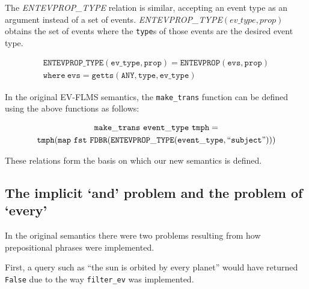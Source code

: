 \documentclass[../main.tex]{subfiles}
\begin{document}
The {\em ENTEVPROP\_TYPE} relation is similar, accepting an event type as an argument instead of a set of events.
{\em ENTEVPROP\_TYPE}$(ev\_type, prop)$ obtains the set of events where the \texttt{type}s of those events are the desired event type.


\begin{definition}
	\begin{multline*}
	\mathtt{ENTEVPROP\_TYPE}(\mathtt{ev\_type}, \mathtt{prop}) = \mathtt{ENTEVPROP}(\mathtt{evs}, \mathtt{prop}) \\ \mathtt{where} \ \mathtt{evs} = \mathtt{getts}(\mathtt{ANY}, \mathtt{type}, \mathtt{ev\_type})
	\end{multline*}
\end{definition}

In the original EV-FLMS semantics, the \texttt{make\_trans} function can be defined using the above functions as follows:

\begin{multline*}
  \mathtt{make\_trans} \ \mathtt{event\_type}\ \mathtt{tmph} = \\ \mathtt{tmph} (\mathtt{map} \ \mathtt{fst}\ \mathtt{FDBR}(\mathtt{ENTEVPROP\_TYPE}(\mathtt{event\_type}, \text{``\texttt{subject}''})))
\end{multline*}

These relations form the basis on which our new semantics is defined.

\subsection{The implicit `and' problem and the problem of `every'}

In the original semantics there were two problems resulting from how prepositional phrases were implemented.

First, a query such as ``the sun is orbited by every planet'' would have returned \texttt{False} due to the way \texttt{filter\_ev} was implemented.
\end{document}
